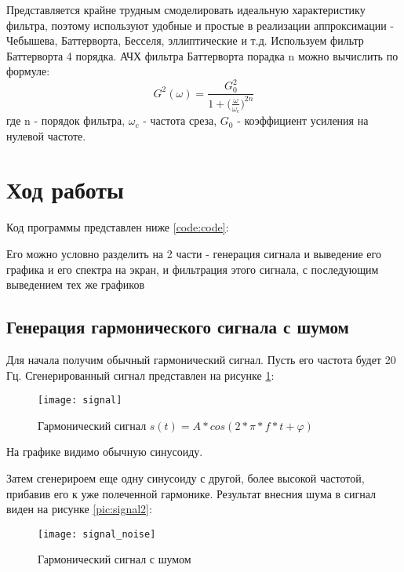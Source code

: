 Представляется крайне трудным смоделировать идеальную характеристику фильтра, поэтому используют удобные и простые в реализации аппроксимации - Чебышева, Баттерворта, Бесселя, эллиптические и т.д. Используем фильтр Баттерворта 4 порядка. АЧХ фильтра Баттерворта порадка n можно вычислить по формуле:
\begin{equation}
	G^2(\omega) = \frac{G^2_0}{1 + \big( \frac{\omega}{\omega _c} \big) ^{2n}}
\end{equation}
где n - порядок фильтра, $\omega _c$ - частота среза, $G_0$ - коэффициент усиления на нулевой частоте.

\section{Ход работы}
Код программы представлен ниже \ref{code:code}:

Его можно условно разделить на 2 части - генерация сигнала и выведение его графика и его спектра на экран, и фильтрация этого сигнала, с последующим выведением тех же графиков

\subsection{Генерация гармонического сигнала с шумом}
Для начала получим обычный гармонический сигнал. Пусть его частота будет 20 Гц. Сгенерированный сигнал представлен на рисунке \ref{pic:signal}:
\begin{figure}[H]
	\begin{center}
		\texttt{[image: signal]}
		\caption{Гармонический сигнал $s(t) = A*cos(2*\pi * f*t + \varphi)$} 
		\label{pic:signal} %
	\end{center}
\end{figure}
На графике видимо обычную синусоиду.

Затем сгенерироем еще одну синусоиду с другой, более высокой частотой, прибавив его к уже полеченной гармонике. Результат внесния шума в сигнал виден на рисунке \ref{pic:signal2}:
\begin{figure}[H]
	\begin{center}
		\texttt{[image: signal\_noise]}
		\caption{Гармонический сигнал с шумом} 
		\label{pic:signal_noise} %
	\end{center}
\end{figure}

